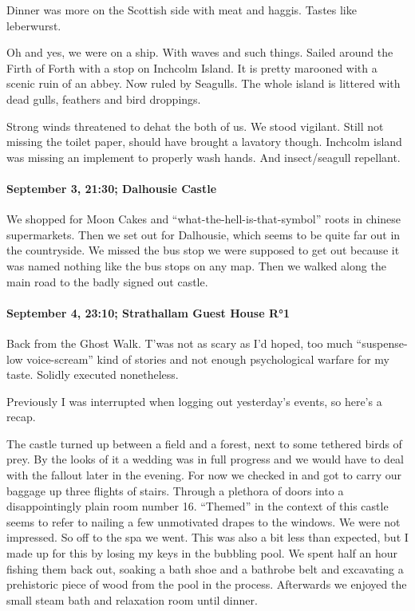 Dinner was more on the Scottish side with meat and haggis.
Tastes like leberwurst.

Oh and yes, we were on a ship.
With waves and such things.
Sailed around the Firth of Forth with a stop on Inchcolm Island.
It is pretty marooned with a scenic ruin of an abbey.
Now ruled by Seagulls.
The whole island is littered with dead gulls, feathers and bird droppings.

Strong winds threatened to dehat the both of us.
We stood vigilant.
Still not missing the toilet paper, should have brought a lavatory though.
Inchcolm island was missing an implement to properly wash hands.
And insect/seagull repellant.

\paragraph{September 3, 21:30; Dalhousie Castle}
We shopped for Moon Cakes and "`what-the-hell-is-that-symbol"' roots in chinese supermarkets.
Then we set out for Dalhousie, which seems to be quite far out in the countryside.
We missed the bus stop we were supposed to get out because it was named nothing like the bus stops on any map.
Then we walked along the main road to the badly signed out castle.

\paragraph{September 4, 23:10; Strathallam Guest House R°1}
Back from the Ghost Walk.
T'was not as scary as I'd hoped, too much "`suspense-low voice-scream"' kind of stories and not enough psychological warfare for my taste.
Solidly executed nonetheless.

Previously I was interrupted when logging out yesterday's events, so here's a recap.

The castle turned up between a field and a forest, next to some tethered birds of prey.
By the looks of it a wedding was in full progress and we would have to deal with the fallout later in the evening.
For now we checked in and got to carry our baggage up three flights of stairs.
Through a plethora of doors into a disappointingly plain room number 16.
"`Themed"' in the context of this castle seems to refer to nailing a few unmotivated drapes to the windows.
We were not impressed.
So off to the spa we went.
This was also a bit less than expected, but I made up for this by losing my keys in the bubbling pool.
We spent half an hour fishing them back out, soaking a bath shoe and a bathrobe belt and excavating a prehistoric piece of wood from the pool in the process.
Afterwards we enjoyed the small steam bath and relaxation room until dinner.

